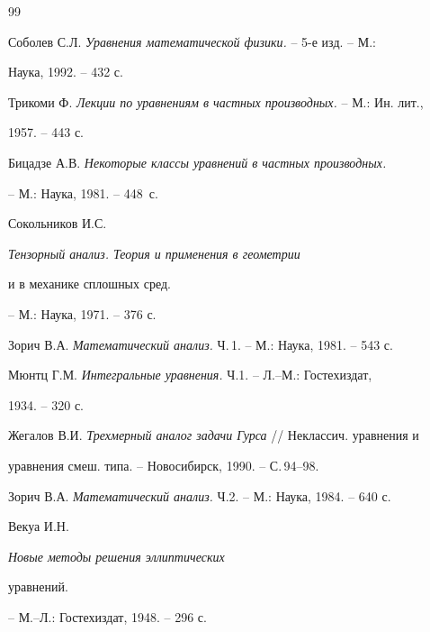\begin{thebibliography}{99}







Соболев С.Л. {\em Уравнения математической физики.} -- 5-е изд. -- М.:


Наука, 1992. -- 432 с.







Трикоми Ф. {\em Лекции по уравнениям в частных производных.} -- М.: Ин. лит.,


1957. -- 443 с.







Бицадзе А.В. {\em Некоторые классы уравнений в частных производных.}


-- М.: Наука, 1981. -- 448~с.







Сокольников И.С.  {\em Тензорный анализ. Теория и применения в геометрии


и в механике сплошных сред.} -- М.: Наука, 1971. -- 376 с.







Зорич В.А. {\em Математический анализ.} Ч.\,1. -- М.: Наука, 1981. -- 543 с.







Мюнтц Г.М. {\em Интегральные уравнения.} Ч.1. -- Л.--М.: Гостехиздат,


1934. -- 320 с.







Жегалов В.И. {\em Трехмерный аналог задачи Гурса} // Неклассич. уравнения и


уравнения смеш. типа. -- Новосибирск, 1990. -- С.\,94--98.







Зорич В.А. {\em Математический анализ.} Ч.2. -- М.: Наука, 1984. -- 640 с.







Векуа И.Н. {\em Новые методы решения эллиптических


уравнений.} -- М.--Л.: Гостехиздат, 1948. -- 296 с.





\end{thebibliography}





